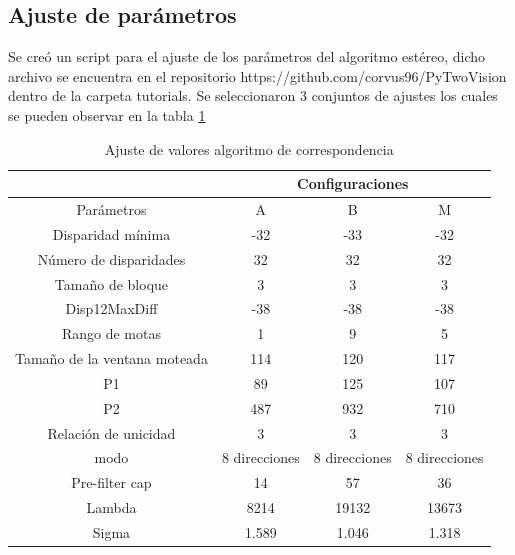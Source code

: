 \subsection{Ajuste de parámetros}
Se creó un script para el ajuste de los parámetros del algoritmo estéreo, dicho archivo se encuentra en el repositorio https://github.com/corvus96/PyTwoVision dentro de la carpeta tutorials. Se seleccionaron 3 conjuntos de ajustes los cuales se pueden observar en la tabla \ref{tune_parameters}
\begin{table}[H]
\centering
\caption{Ajuste de valores algoritmo de correspondencia}
\label{tune_parameters}
\begin{tabular}{|c|ccc|}
\hline
                             & \multicolumn{3}{c|}{Configuraciones}                                                    \\ \hline
Parámetros                   & \multicolumn{1}{c|}{A}             & \multicolumn{1}{c|}{B}             & M             \\ \hline
Disparidad mínima            & \multicolumn{1}{c|}{-32}           & \multicolumn{1}{c|}{-33}           & -32           \\ \hline
Número de disparidades       & \multicolumn{1}{c|}{32}            & \multicolumn{1}{c|}{32}            & 32            \\ \hline
Tamaño de bloque             & \multicolumn{1}{c|}{3}             & \multicolumn{1}{c|}{3}             & 3             \\ \hline
Disp12MaxDiff                & \multicolumn{1}{c|}{-38}           & \multicolumn{1}{c|}{-38}            & -38            \\ \hline
Rango de motas               & \multicolumn{1}{c|}{1}             & \multicolumn{1}{c|}{9}             & 5             \\ \hline
Tamaño de la ventana moteada & \multicolumn{1}{c|}{114}           & \multicolumn{1}{c|}{120}           & 117           \\ \hline
P1                           & \multicolumn{1}{c|}{89}           & \multicolumn{1}{c|}{125}            & 107           \\ \hline
P2                           & \multicolumn{1}{c|}{487}          & \multicolumn{1}{c|}{932}          & 710          \\ \hline
Relación de unicidad         & \multicolumn{1}{c|}{3}             & \multicolumn{1}{c|}{3}             & 3             \\ \hline
modo                         & \multicolumn{1}{c|}{8 direcciones} & \multicolumn{1}{c|}{8 direcciones} & 8 direcciones \\ \hline
Pre-filter cap               & \multicolumn{1}{c|}{14}            & \multicolumn{1}{c|}{57}            & 36            \\ \hline
Lambda                       & \multicolumn{1}{c|}{8214}         & \multicolumn{1}{c|}{19132}         & 13673         \\ \hline
Sigma                        & \multicolumn{1}{c|}{1.589}         & \multicolumn{1}{c|}{1.046}          & 1.318         \\ \hline
\end{tabular}
\end{table}
